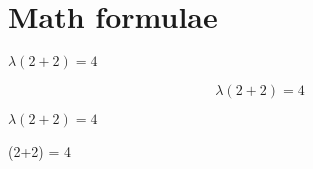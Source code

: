 \documentclass{article}
\begin{document}
\section{Math formulae}

$\lambda (2+2) = 4$

\[\lambda (2+2) = 4\]

\(\lambda (2+2) = 4\)

\begin{display}
\lambda (2+2) = 4
\end{display}
\end{document}
